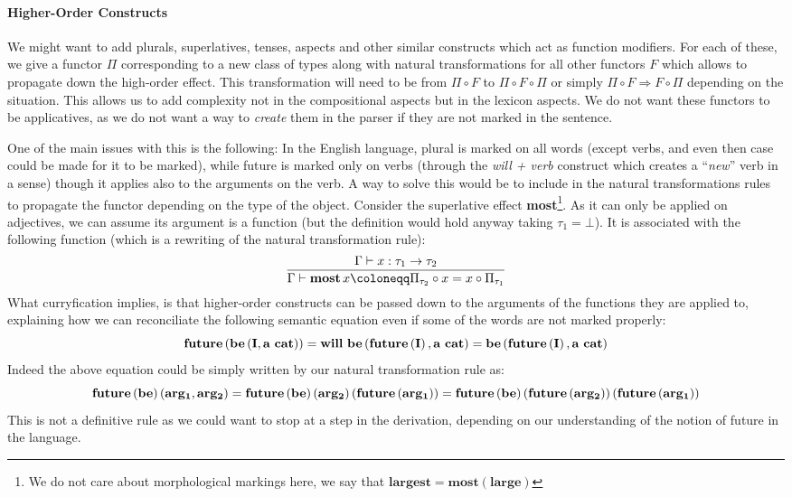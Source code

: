 \paragraph{Higher-Order Constructs}
\label{par:higherorder}
We might want to add plurals, superlatives, tenses, aspects and other similar constructs which act as function modifiers.
For each of these, we give a functor $\Pi$ corresponding to a new class of types along with natural transformations for all other functors $F$ which allows to propagate down the high-order effect.
This transformation will need to be from $\Pi \circ F$ to $\Pi \circ F \circ \Pi$ or simply $\Pi \circ F \Rightarrow F \circ \Pi$ depending on the situation.
This allows us to add complexity not in the compositional aspects but in the lexicon aspects.
We do not want these functors to be applicatives, as we do not want a way to \emph{create} them in the parser if they are not marked in the sentence.

One of the main issues with this is the following:
In the English language, plural is marked on all words (except verbs, and even then case could be made for it to be marked),
while future is marked only on verbs (through the \textit{will + verb} construct which creates a ``\emph{new}'' verb in a sense) though it applies also to the arguments on the verb.
A way to solve this would be to include in the natural transformations rules to propagate the functor depending on the type of the object.
Consider the superlative effect \textbf{most}\footnote{We do not care about morphological markings here, we say that $\mathbf{largest} = \mathbf{most} \left(\mathbf{large}\right)$}.
As it can only be applied on adjectives, we can assume its argument is a function (but the definition would hold anyway taking $\tau_{1} = \bot$).
It is associated with the following function (which is a rewriting of the natural transformation rule):
\begin{equation*}
	\frac{\cont x: \tau_{1} \to \tau_{2}}{\cont \mathbf{most}\, x \coloneqq \Pi_{\tau_{2}} \circ x = x \circ \Pi_{\tau_{1}}}
\end{equation*}
What curryfication implies, is that higher-order constructs can be passed down to the arguments of the functions they are applied to, explaining how we can reconciliate the following semantic equation even if some of the words are not marked properly:
\begin{equation*}
	\bf future\left(be\left( I, a\ cat \right)\right) = will\ be\left( future\left( I \right), a\ cat \right) = be\left( future\left( I \right), a\ cat \right)
\end{equation*}
Indeed the above equation could be simply written by our natural transformation rule as:
\begin{equation*}
	\bf future\left( be \right)\left( arg_{1}, arg_{2} \right) = future\left( be \right)\left( arg_{2} \right)\left( future\left( arg_{1} \right) \right) = future \left( be \right) \left( future \left( arg_{2} \right) \right) \left( future \left( arg_{1} \right) \right)
\end{equation*}
This is not a definitive rule as we could want to stop at a step in the derivation, depending on our understanding of the notion of future in the language.

